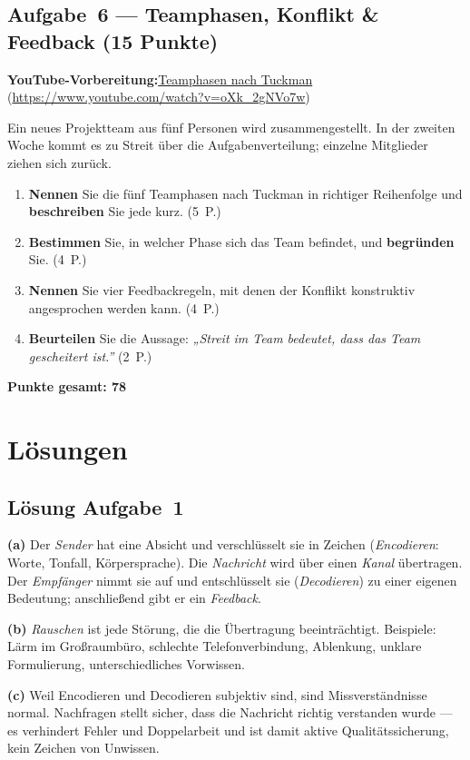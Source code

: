 \documentclass[11pt, a4paper]{article}
\begin{document}
\subsection*{Aufgabe~6 --- Teamphasen, Konflikt \& Feedback (15 Punkte)}

\noindent\textbf{\color{bfwAccent}YouTube-Vorbereitung:}\enspace \href{https://www.youtube.com/watch?v=oXk_2gNVo7w}{Teamphasen nach Tuckman} (\url{https://www.youtube.com/watch?v=oXk_2gNVo7w})

\medskip
Ein neues Projektteam aus fünf Personen wird zusammengestellt. In der zweiten Woche kommt
es zu Streit über die Aufgabenverteilung; einzelne Mitglieder ziehen sich zurück.

\begin{enumerate}[label=(\alph*)]
  \item \textbf{Nennen} Sie die fünf Teamphasen nach Tuckman in richtiger Reihenfolge und \textbf{beschreiben} Sie jede kurz. \hfill (5~P.)
  \item \textbf{Bestimmen} Sie, in welcher Phase sich das Team befindet, und \textbf{begründen} Sie. \hfill (4~P.)
  \item \textbf{Nennen} Sie vier Feedbackregeln, mit denen der Konflikt konstruktiv angesprochen werden kann. \hfill (4~P.)
  \item \textbf{Beurteilen} Sie die Aussage: \emph{„Streit im Team bedeutet, dass das Team gescheitert ist.”} \hfill (2~P.)
\end{enumerate}

\vspace{1em}
\noindent\textbf{Punkte gesamt: 78}

\newpage

\section{Lösungen}\label{loesungen}

\subsection*{Lösung Aufgabe~1}
\begin{loesung}
\textbf{(a)} Der \emph{Sender} hat eine Absicht und verschlüsselt sie in Zeichen
(\emph{Encodieren}: Worte, Tonfall, Körpersprache). Die \emph{Nachricht} wird über einen
\emph{Kanal} übertragen. Der \emph{Empfänger} nimmt sie auf und entschlüsselt sie
(\emph{Decodieren}) zu einer eigenen Bedeutung; anschließend gibt er ein \emph{Feedback}.

\textbf{(b)} \emph{Rauschen} ist jede Störung, die die Übertragung beeinträchtigt.
Beispiele: Lärm im Großraumbüro, schlechte Telefonverbindung, Ablenkung, unklare
Formulierung, unterschiedliches Vorwissen.

\textbf{(c)} Weil Encodieren und Decodieren subjektiv sind, sind Missverständnisse normal.
Nachfragen stellt sicher, dass die Nachricht richtig verstanden wurde --- es verhindert
Fehler und Doppelarbeit und ist damit aktive Qualitätssicherung, kein Zeichen von
Unwissen.
\end{loesung}
\end{document}
